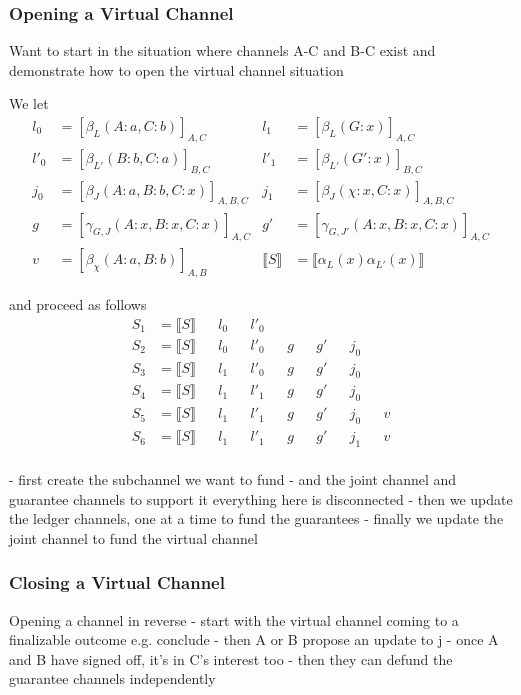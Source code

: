 \documentclass{article}
\theoremstyle{definition}
\newcommand{\adj}[1]{\llbracket #1 \rrbracket}
\newcommand{\enf}[1]{[#1]}
\begin{document}
\subsubsection{Opening a Virtual Channel}

Want to start in the situation where channels A-C and B-C exist and demonstrate how to
open the virtual channel situation

We let
\begin{align*}
l_0 &= \enf{\beta_L(A:a, C: b)}_{A, C} &
l_1 &= \enf{\beta_L(G: x)}_{A, C} \\
l'_0 &= \enf{\beta_{L'}(B:b, C: a)}_{B, C} &
l'_1 &= \enf{\beta_{L'}(G': x)}_{B, C} \\
j_0 &= \enf{\beta_{J}(A: a, B:b, C: x)}_{A, B, C} &
j_1 &= \enf{\beta_{J}(\chi: x, C: x)}_{A, B, C} \\
g &= \enf{\gamma_{G, J}(A: x, B:x, C: x)}_{A, C} &
g' &= \enf{\gamma_{G, J'}(A: x, B:x, C: x)}_{A, C} \\
v &= \enf{\beta_\chi(A: a, B: b)}_{A, B} &
\adj{S} &= \adj{\alpha_L(x)\alpha_{L'}(x)}
\end{align*}

and proceed as follows
\begin{align*}
S_1 &= \adj{S} && l_0 && l'_0 \\
S_2 &= \adj{S} && l_0 && l'_0 && g && g' && j_0 \\
S_3 &= \adj{S} && l_1 && l'_0 && g && g' && j_0 \\
S_4 &= \adj{S} && l_1 && l'_1 && g && g' && j_0 \\
S_5 &= \adj{S} && l_1 && l'_1 && g && g' && j_0 && v\\
S_6 &= \adj{S} && l_1 && l'_1 && g && g' && j_1 && v\\
\end{align*}

- first create the subchannel we want to fund
- and the joint channel and guarantee channels to support it
everything here is disconnected
- then we update the ledger channels, one at a time to fund the guarantees
- finally we update the joint channel to fund the virtual channel

\subsubsection{Closing a Virtual Channel}

Opening a channel in reverse
- start with the virtual channel coming to a finalizable outcome e.g. conclude
- then A or B propose an update to j
- once A and B have signed off, it's in C's interest too
- then they can defund the guarantee channels independently
\end{document}
